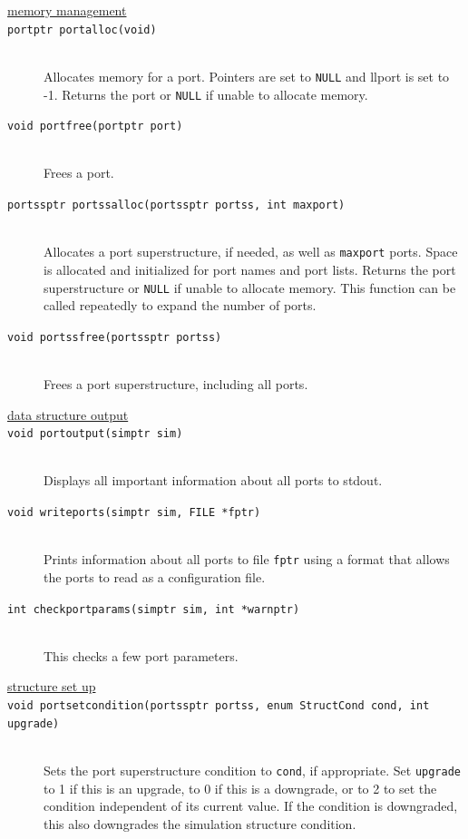 \documentclass {scrbook}
\newcommand {\ttt} {\texttt}
\begin{document}
\begin{description}

\item[\underline{memory management}]

\item[\ttt{portptr portalloc(void)}]
\hfill \\
Allocates memory for a port. Pointers are set to \ttt{NULL} and llport is set to -1. Returns the port or \ttt{NULL} if unable to allocate memory.

\item[\ttt{void portfree(portptr port)}]
\hfill \\
Frees a port.

\item[\ttt{portssptr portssalloc(portssptr portss, int maxport)}]
\hfill \\
Allocates a port superstructure, if needed, as well as \ttt{maxport} ports. Space is allocated and initialized for port names and port lists. Returns the port superstructure or \ttt{NULL} if unable to allocate memory. This function can be called repeatedly to expand the number of ports.

\item[\ttt{void portssfree(portssptr portss)}]
\hfill \\
Frees a port superstructure, including all ports.

\item[\underline{data structure output}]

\item[\ttt{void portoutput(simptr sim)}]
\hfill \\
Displays all important information about all ports to stdout.

\item[\ttt{void writeports(simptr sim, FILE *fptr)}]
\hfill \\
Prints information about all ports to file \ttt{fptr} using a format that allows the ports to read as a configuration file.

\item[\ttt{int checkportparams(simptr sim, int *warnptr)}]
\hfill \\
This checks a few port parameters.

\item[\underline{structure set up}]

\item[\ttt{void portsetcondition(portssptr portss, enum StructCond cond, int upgrade)}]
\hfill \\
Sets the port superstructure condition to \ttt{cond}, if appropriate. Set \ttt{upgrade} to 1 if this is an upgrade, to 0 if this is a downgrade, or to 2 to set the condition independent of its current value. If the condition is downgraded, this also downgrades the simulation structure condition.


\end{description}
\end{document}
